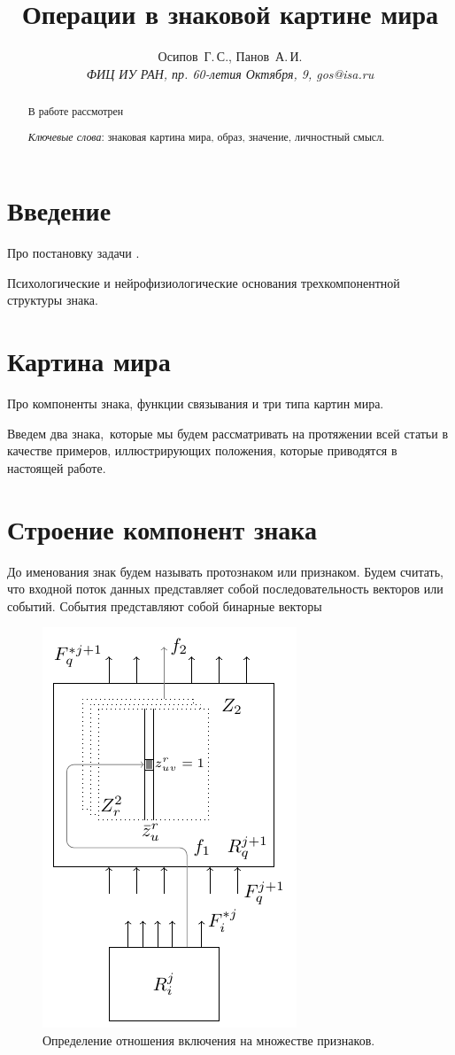 \documentclass[12pt]{scrartcl}
\title{Операции в знаковой картине мира}
\author{Осипов~Г.\,С., Панов~А.\,И.\\
	{\large\slshape ФИЦ ИУ РАН, пр. 60-летия Октября, 9, gos@isa.ru}}
\begin{document}
	
	\maketitle{}
	\begin{abstract}
		В работе рассмотрен
		\par\bigskip
		\textit{Ключевые слова}: знаковая картина мира, образ, значение, личностный смысл.
	\end{abstract}
	
	
	
	\section*{Введение}
	Про постановку задачи \cite{Osipov2014c,Osipov2015d}.
	
	Психологические и нейрофизиологические основания трехкомпонентной структуры знака.
	
	\section{Картина мира}

	Про компоненты знака, функции связывания и три типа картин мира.
	
	Введем два знака,~которые мы будем рассматривать на протяжении всей статьи в качестве примеров, иллюстрирующих положения, которые приводятся в настоящей работе.
	
	
	\section{Строение компонент знака}
	
	До именования знак будем называть протознаком или признаком.
	Будем считать, что входной поток данных представляет собой последовательность векторов или событий. События представляют собой бинарные векторы 
	
	\begin{figure}[h]
		\centering
		\includegraphics[width=0.3\linewidth]{automata/meas}
		\caption{Определение отношения включения на множестве признаков.}
		\label{fig:rb_measure}
	\end{figure}
	
\end{document}

